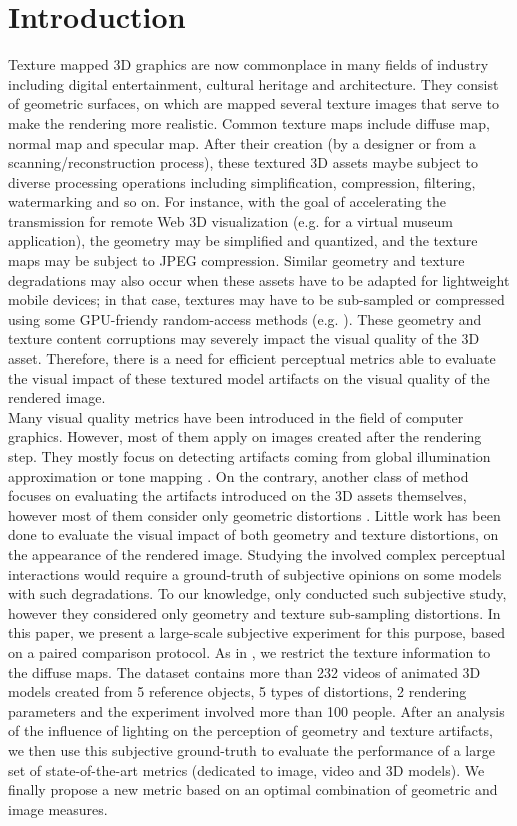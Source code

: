 \section{Introduction}
Texture mapped 3D graphics are now commonplace in many fields of industry including digital entertainment, cultural heritage and architecture. They consist of geometric surfaces, on which are mapped several texture images that serve to make the rendering more realistic. Common texture maps include diffuse map, normal map and specular map. After their creation (by a designer or from a scanning/reconstruction process), these textured 3D assets maybe subject to diverse processing operations including simplification, compression, filtering, watermarking and so on. For instance, with the goal of accelerating the transmission for remote Web 3D visualization (e.g. for a virtual museum application), the geometry may be simplified and quantized, and the texture maps may be subject to JPEG compression. Similar geometry and texture degradations may also occur when these assets have to be adapted for lightweight mobile devices; in that case, textures may have to be sub-sampled or compressed using some GPU-friendy random-access methods (e.g. \cite{Strom2005}). These geometry and texture content corruptions may severely impact the visual quality of the 3D asset. Therefore, there is a need for efficient perceptual metrics able to evaluate the visual impact of these textured model artifacts on the visual quality of the rendered image.\\
Many visual quality metrics have been introduced in the field of computer graphics. However, most of them apply on images created after the rendering step. They mostly focus on detecting artifacts coming from global illumination approximation or tone mapping \cite{Aydin2010,Herzog2012,Yeganeh2013,Cadik2013}. On the contrary, another class of method focuses on evaluating the artifacts introduced on the 3D assets themselves, however most of them consider only geometric distortions \cite{Lavoue2011,Vasa2012,Wang2012}. Little work has been done to evaluate the visual impact of both geometry and texture distortions, on the appearance of the rendered image. Studying the involved complex perceptual interactions would require a ground-truth of subjective opinions on some models with such degradations. To our knowledge, only \citet{Pan2005} conducted such subjective study, however they considered only geometry and texture sub-sampling distortions. In this paper, we present a large-scale subjective experiment for this purpose, based on a paired comparison protocol. As in \cite{Pan2005}, we restrict the texture information to the diffuse maps. The dataset contains more than 232 videos of animated 3D models created from 5 reference objects, 5 types of distortions, 2 rendering parameters and the experiment involved more than 100 people. After an analysis of the influence of lighting on the perception of geometry and texture artifacts, we then use this subjective ground-truth to evaluate the performance of a large set of state-of-the-art metrics (dedicated to image, video and 3D models). We finally propose a new metric based on an optimal combination of geometric and image measures.\\ 



